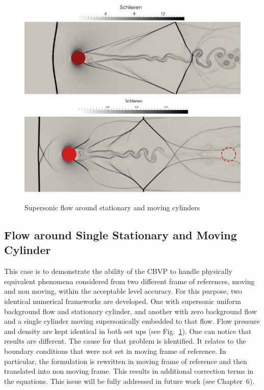 \begin{figure}[h!]
\centering \includegraphics[scale=0.21]{fig/nonmov_res.png}\\
\centering \includegraphics[scale=0.2]{fig/moving_res.png}
\caption{Supersonic flow around stationary and moving cylinders \label{fig:mov_res}}
\end{figure}
\subsection{Flow around Single Stationary and Moving Cylinder}
This case is to demonstrate the ability of the CBVP to handle physically equivalent phenomena considered from two different frame of references, moving and non moving, within the acceptable level accuracy. For this purpose, two identical numerical frameworks are developed. One with supersonic uniform background flow and stationary cylinder, and another with zero background flow and a single cylinder moving supersonically embedded to that flow. Flow pressure and density are kept identical in both set ups (see Fig.~\ref{fig:mov_res}). One can notice that results are different. The cause for that problem is identified. It relates to the boundary conditions that were not set in moving frame of reference. In particular, the formulation is rewritten in moving frame of reference and then translated into non moving frame. This results in additional correction terms in the equations. This issue will be fully addressed in future work (see Chapter~6).



